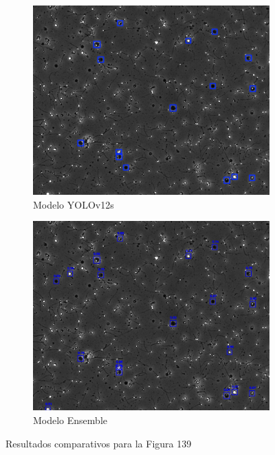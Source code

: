 \documentclass[12pt,a4paper,onecolumn,oneside]{report}
\begin{document}
\begin{figure}[H]
  \vspace{0.3cm} 
  
  \begin{subfigure}[b]{0.48\textwidth}
    \centering
    \includegraphics[width=\textwidth]{figuras/evaluacion_cualitativa/139/139_v12.jpg}
    \caption{Modelo YOLOv12s}
    \label{fig:yolov12s_image_139}
  \end{subfigure}
  \hfill
  \begin{subfigure}[b]{0.48\textwidth}
    \centering
    \includegraphics[width=\textwidth]{figuras/evaluacion_cualitativa/139/139_ensemble.jpg}
    \caption{Modelo Ensemble}
    \label{fig:ensemble_image_139}
  \end{subfigure}
  
  \caption{Resultados comparativos para la Figura 139}
  \label{fig:139}
\end{figure}
\end{document}
